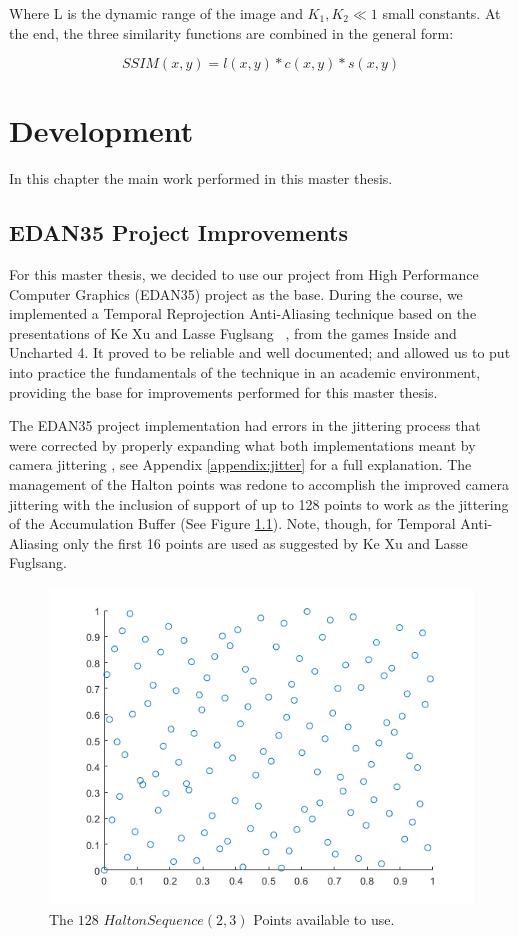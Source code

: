 \documentclass{cslthse-msc}
\begin{document}
Where L is the dynamic range of the image and $K_1,K_2\ll1$ small constants. At the end, the three similarity functions are combined in the general form: 

\begin{equation}\label{eq:ssim}
SSIM(x,y)=l(x,y)*c(x,y)*s(x,y)
\end{equation}



\chapter{Development}
In this chapter the main work performed in this master thesis.
\section{EDAN35 Project Improvements}
For this master thesis, we decided to use our project from High Performance Computer Graphics (EDAN35) project as the base. During the course, we implemented a Temporal Reprojection Anti-Aliasing technique based on the presentations of Ke Xu and Lasse Fuglsang ~\cite{Fuglsand2016,XU2016}, from the games Inside and Uncharted 4. It proved to be reliable and well documented; and allowed us to put into practice the fundamentals of the technique in an academic environment, providing the base for improvements performed for this master thesis.

The EDAN35 project implementation had errors in the jittering process that were corrected by properly expanding what both implementations meant by camera jittering , see Appendix \ref{appendix:jitter} for a full explanation. The management of the Halton points was redone to accomplish the improved camera jittering with the inclusion of support of up to 128 points to work as the jittering of the Accumulation Buffer (See Figure \ref{fig:halton128}). Note, though, for Temporal Anti-Aliasing only the first 16 points are used as suggested by Ke Xu and Lasse Fuglsang. ~\cite{Fuglsand2016,XU2016}

\begin{figure}[!hbt]
	\centering
	\includegraphics[scale=0.5]{images/halton_128.png}
	\caption{The $128$ $Halton Sequence (2,3)$ Points available to use.}\label{fig:halton128}
\end{figure}
\end{document}
